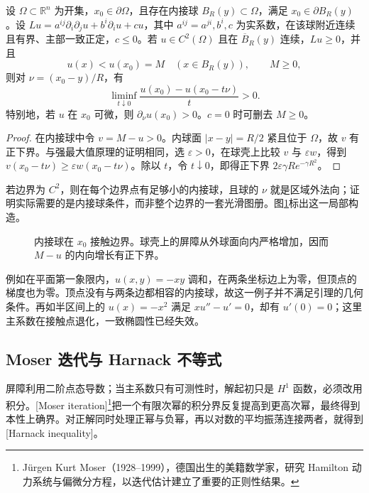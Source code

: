 \begin{theorem}\label{g3:thm:hopf-boundary-lemma}
	设 \(\Omega\subset\mathbb R^n\) 为开集，\(x_0\in\partial\Omega\)，且存在内接球 \(B_R(y)\subset\Omega\)，满足 \(x_0\in\partial B_R(y)\)。设 \(Lu=a^{ij}\partial_i\partial_ju+b^i\partial_i u+cu\)，其中 \(a^{ij}=a^{ji},b^i,c\) 为实系数，在该球附近连续且有界、主部一致正定，\(c\le0\)。若 \(u\in C^2(\Omega)\) 且在 \(\overline B_R(y)\) 连续，\(Lu\ge0\)，并且
	\[
		u(x)<u(x_0)=M\quad(x\in B_R(y)),\qquad M\ge0,
	\]
	则对 \(\nu=(x_0-y)/R\)，有
	\[
		\liminf_{t\downarrow0}\frac{u(x_0)-u(x_0-t\nu)}t>0.
	\]
	特别地，若 \(u\) 在 \(x_0\) 可微，则 \(\partial_\nu u(x_0)>0\)。\(c=0\) 时可删去 \(M\ge0\)。
\end{theorem}
\begin{proof}
	在内接球中令 \(v=M-u>0\)。内球面 \(|x-y|=R/2\) 紧且位于 \(\Omega\)，故 \(v\) 有正下界。与强最大值原理的证明相同，选 \(\varepsilon>0\)，在球壳上比较 \(v\) 与 \(\varepsilon w\)，得到
	\(v(x_0-t\nu)\ge\varepsilon w(x_0-t\nu)\)。除以 \(t\)，令 \(t\downarrow0\)，即得正下界 \(2\varepsilon\gamma R e^{-\gamma R^2}\)。
\end{proof}

若边界为 \(C^2\)，则在每个边界点有足够小的内接球，且球的 \(\nu\) 就是区域外法向；证明实际需要的是内接球条件，而非整个边界的一套光滑图册。图\cref{g3:fig:hopf-barrier}标出这一局部构造。
\begin{figure}[htbp]
	\centering
	
	\caption[内接球与 Hopf 屏障]{内接球在 \(x_0\) 接触边界。球壳上的屏障从外球面向内严格增加，因而 \(M-u\) 的内向增长有正下界。}
	\label{g3:fig:hopf-barrier}
\end{figure}

例如在平面第一象限内，\(u(x,y)=-xy\) 调和，在两条坐标边上为零，但顶点的梯度也为零。顶点没有与两条边都相容的内接球，故这一例子并不满足引理的几何条件。再如半区间上的 \(u(x)=-x^2\) 满足 \(xu''-u'=0\)，却有 \(u'(0)=0\)；这里主系数在接触点退化，一致椭圆性已经失效。

\subsection{Moser 迭代与 Harnack 不等式}
\label{g3:subsec:1207:04}
屏障利用二阶点态导数；当主系数只有可测性时，解起初只是 \(H^1\) 函数，必须改用积分。[Moser iteration]\footnote{Jürgen Kurt Moser（1928--1999），德国出生的美籍数学家，研究 Hamilton 动力系统与偏微分方程，以迭代估计建立了重要的正则性结果。}把一个有限次幂的积分界反复提高到更高次幂，最终得到本性上确界。对正解同时处理正幂与负幂，再以对数的平均振荡连接两者，就得到[Harnack inequality]。

